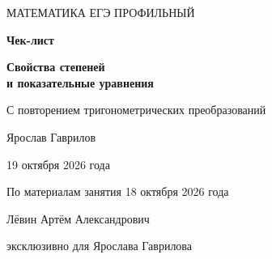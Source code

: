 \documentclass[a4paper,12pt]{article}
\begin{document}
\thispagestyle{empty}
\vspace*{34mm}
\begin{center}
{\large\textcolor{accent}{МАТЕМАТИКА \quad\textbullet\quad ЕГЭ ПРОФИЛЬНЫЙ}}\par
\vspace{17mm}
{\fontsize{35}{40}\selectfont\bfseries\textcolor{darkaccent}{Чек-лист}}\par
\vspace{12mm}
{\LARGE\bfseries Свойства степеней\\[5pt] и показательные уравнения}\par
\vspace{7mm}
{\large С повторением тригонометрических преобразований}\par
\vspace{19mm}
{\Large Ярослав Гаврилов}\par
\vspace{5mm}
{\large 19 октября 2026 года}\par
{\normalsize\textcolor{textgray}{По материалам занятия 18 октября 2026 года}}\par
\end{center}
\vfill
\begin{center}
\textcolor{darkaccent}{Лёвин Артём Александрович}\par
\textcolor{textgray}{эксклюзивно для Ярослава Гаврилова}
\end{center}
\clearpage
\end{document}
